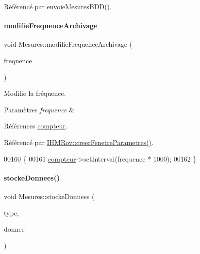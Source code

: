 Référencé par \hyperlink{class_mesures_a9eb8d49c9f60b3801110a5c3d0c50149}{envoie\+Mesures\+B\+D\+D()}.

\mbox{\label{class_mesures_ac1d2ea97f648264ebd690fba8f7020cc}} 
\paragraph{\texorpdfstring{modifie\+Frequence\+Archivage}{modifieFrequenceArchivage}}
{\footnotesize\ttfamily void Mesures\+::modifie\+Frequence\+Archivage (\begin{DoxyParamCaption}\item[{int}]{frequence }\end{DoxyParamCaption})\hspace{0.3cm}{\ttfamily [slot]}}

Modifie la fréquence.


\begin{DoxyParams}{Paramètres}
{\em frequence} & \\
\hline
\end{DoxyParams}


Références \hyperlink{class_mesures_a89af5f279d21cf10f5d6bd58bbc33173}{compteur}.



Référencé par \hyperlink{class_i_h_m_rov_aed451139ac09ef18b7c92637761d80ce}{I\+H\+M\+Rov\+::creer\+Fenetre\+Parametres()}.


\begin{DoxyCode}
00160 \{
00161     \hyperlink{class_mesures_a89af5f279d21cf10f5d6bd58bbc33173}{compteur}->setInterval(frequence * 1000);
00162 \}
\end{DoxyCode}
\mbox{\label{class_mesures_a77652c2332a9234bf08b463d1d389aa5}} 
\paragraph{\texorpdfstring{stocke\+Donnees()}{stockeDonnees()}}
{\footnotesize\ttfamily void Mesures\+::stocke\+Donnees (\begin{DoxyParamCaption}\item[{Q\+String}]{type,  }\item[{Q\+String}]{donnee }\end{DoxyParamCaption})}

